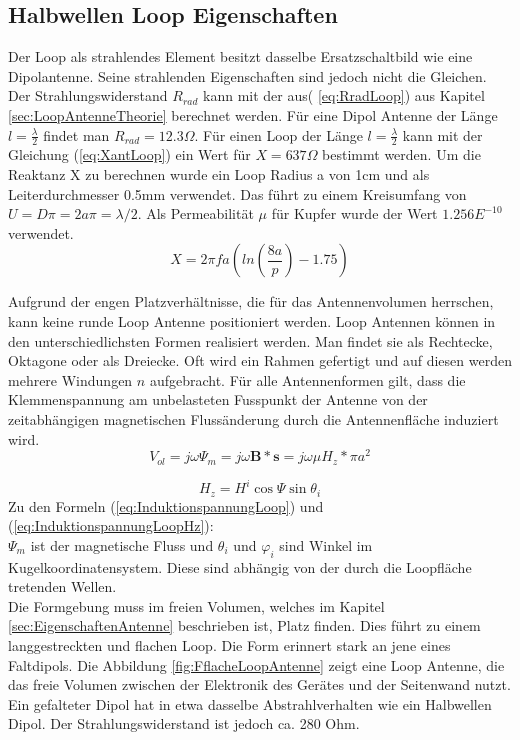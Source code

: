 \subsection{Halbwellen Loop Eigenschaften}
Der Loop als strahlendes Element besitzt dasselbe Ersatzschaltbild wie eine Dipolantenne. Seine strahlenden Eigenschaften sind jedoch nicht die Gleichen. Der Strahlungswiderstand $R_{rad}$ kann mit der aus( \ref{eq:RradLoop}) aus Kapitel \ref{sec:LoopAntenneTheorie} berechnet werden. Für eine Dipol Antenne der Länge $l=\frac{\lambda}{2}$ findet man $R_{rad} = 12.3\Omega$. Für einen Loop der Länge $l=\frac{\lambda}{2}$ kann mit der Gleichung (\ref{eq:XantLoop}) ein Wert für $X = 637 \Omega$ bestimmt werden. Um die Reaktanz X zu berechnen wurde ein Loop Radius a von 1cm und als Leiterdurchmesser 0.5mm verwendet. Das führt zu einem Kreisumfang von $U=D\pi=2a\pi=\lambda /2$. Als Permeabilität $\mu $ für Kupfer wurde der Wert $1.256E^{-10}$ verwendet.
\begin{equation}\label{eq:XantLoop}
X= 2\pi f a(ln \left( \frac{8a}{p} \right) - 1.75)
\end{equation}

Aufgrund der engen Platzverhältnisse, die für das Antennenvolumen herrschen, kann keine runde Loop Antenne positioniert werden. Loop Antennen können in den unterschiedlichsten Formen realisiert werden. Man findet sie als Rechtecke, Oktagone oder als Dreiecke. Oft wird ein Rahmen gefertigt und auf diesen  werden mehrere Windungen $n$ aufgebracht. Für alle Antennenformen gilt, dass die Klemmenspannung am unbelasteten Fusspunkt der Antenne von der zeitabhängigen magnetischen Flussänderung durch die Antennenfläche induziert wird.
\begin{equation}\label{eq:InduktionspannungLoop}
V_{ol}= j\omega\Psi_{m}=j\omega\textbf{B}*\textbf{s}= j\omega\mu H_{z}*\pi a^{2}
\end{equation}

\begin{equation}\label{eq:InduktionspannungLoopHz}
H_{z}=H^{i}\cos\Psi\sin\theta_{i}
\end{equation}
Zu den Formeln (\ref{eq:InduktionspannungLoop}) und (\ref{eq:InduktionspannungLoopHz}): \\
$\Psi_{m}$ ist der magnetische Fluss und $\theta_{i}$ und $\varphi_{i}$  sind  Winkel im Kugelkoordinatensystem. Diese sind  abhängig von der durch die Loopfläche tretenden Wellen.\\ 
Die Formgebung muss im freien Volumen, welches im Kapitel \ref{sec:EigenschaftenAntenne} beschrieben ist, Platz finden. Dies führt zu einem langgestreckten und flachen Loop. Die Form erinnert stark an jene eines Faltdipols. Die Abbildung \ref{fig:FflacheLoopAntenne} zeigt eine Loop Antenne, die das freie Volumen zwischen der Elektronik des Gerätes und der Seitenwand nutzt.\\
Ein gefalteter Dipol hat in etwa dasselbe Abstrahlverhalten wie ein Halbwellen Dipol. Der Strahlungswiderstand ist jedoch  ca.  280 Ohm. 

